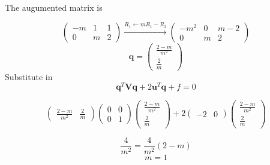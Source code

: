 \documentclass[10pt, a4paper]{article}
\newcommand{\myvec}[1]{\ensuremath{\begin{pmatrix}#1\end{pmatrix}}}
\let\vec\mathbf
\begin{document}
The augumented matrix is

\begin{equation}
        \myvec{-m & 1 & 1 \\ 0 & m & 2}\xrightarrow[]{R_1 \leftarrow  mR_1 - R_2 } \myvec{-m^2 & 0 & m-2 \\ 0 & m & 2}
\end{equation}
\begin{equation}
        \vec{q} = \myvec{\frac{2 - m}{m^2} \\ \frac{2}{m}}
\end{equation}
Substitute in
\begin{equation}
        \vec{q}^T\vec{V}\vec{q} + 2\vec{u}^T\vec{q} + f = 0
\end{equation}

\begin{equation}
	\myvec{\frac{2 - m}{m^2} & \frac{2}{m}}\myvec{0&0\\0&1}\myvec{\frac{2 - m}{m^2} \\ \frac{2}{m}} + 2\myvec{-2 & 0}\myvec{\frac{2 - m}{m^2} \\ \frac{2}{m}}
\end{equation}

\begin{equation}
        \frac{4}{m^2} = \frac{4}{m^2} (2 - m)
\end{equation}
\begin{equation}
        m = 1
\end{equation}
\end{document}
